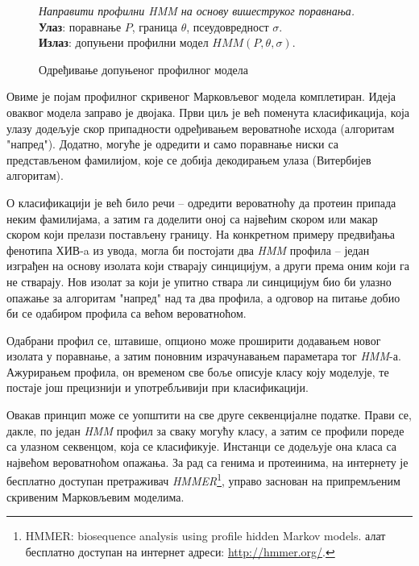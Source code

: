 \documentclass[12pt,oneside]{memoir}
\newenvironment{problem}[1][!ht]
{\renewcommand{\algorithmcfname}{Проблем}
\begin{figure}[!ht]
\centering
  \begin{minipage}{.94\linewidth}
	\begin{algorithm}[#1]%
  }{\end{algorithm}
  \end{minipage}
\end{figure}}
\begin{document}
\begin{CJK}{UTF8}{ipxm}
\begin{problem}[H]
  \SetAlgoLined
  \textit{Направити профилни \textit{HMM} на основу вишеструког поравнања.}\\
  \textbf{Улаз}: поравнање $P$, граница $\theta$, псеудовредност $\sigma$.\\
  \textbf{Излаз}: допуњени профилни модел $HMM(P, \theta, \sigma)$.
  \caption[]{Одређивање допуњеног профилног модела\footnotemark}
  \label{prob:prof_sigma}
\end{problem}


Овиме је појам профилног скривеног Марковљевог модела комплетиран. Идеја оваквог модела заправо је двојака. Први циљ је већ поменута класификација, која улазу додељује скор припадности одређивањем вероватноће исхода (алгоритам "напред"). Додатно, могуће је одредити и само поравнање ниски са представљеном фамилијом, које се добија декодирањем улаза (Витербијев алгоритам).

О класификацији је већ било речи -- одредити вероватноћу да протеин припада неким фамилијама, а затим га доделити оној са највећим скором или макар скором који прелази постављену границу. На конкретном примеру предвиђања фенотипа ХИВ-a из увода, могла би постојати два \textit{HMM} профила -- један изграђен на основу изолата који стварају синцицијум, а други према оним који га не стварају. Нов изолат за који је упитно ствара ли синцицијум био би улазно опажање за алгоритам "напред" над та два профила, а одговор на питање добио би се одабиром профила са већом вероватноћом.

Одабрани профил се, штавише, опционо може проширити додавањем новог изолата у поравнање, а затим поновним израчунавањем параметара тог \textit{HMM}-а. Ажурирањем профила, он временом све боље описује класу коју моделује, те постаје још прецизнији и употребљивији при класификацији.

Овакав принцип може се уопштити на све друге секвенцијалне податке. Прави се, дакле, по један \textit{HMM} профил за сваку могућу класу, а затим се профили пореде са улазном секвенцом, која се класификује. Инстанци се додељује она класа са највећом вероватноћом опажања. За рад са генима и протеинима, на интернету је бесплатно доступан претраживач \textit{HMMER}\footnote{HMMER: biosequence analysis using profile hidden Markov models. алат бесплатно доступан на интернет адреси: \url{http://hmmer.org/}.}, управо заснован на припремљеним скривеним Марковљевим моделима.


\end{CJK}
\end{document}

